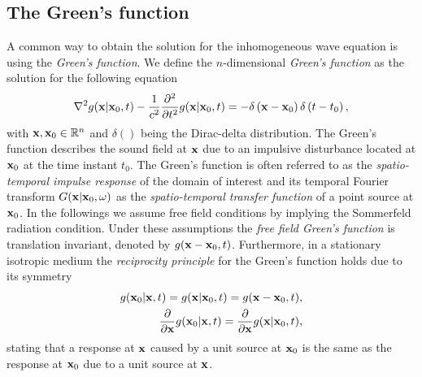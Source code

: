 \subsection{The Green's function}
A common way to obtain the solution for the inhomogeneous wave equation is using the \emph{Green's function}. 
We define the $n$-dimensional \emph{Green's function} as the solution for the following equation \cite{Gumerov2004, Williams1999}
\begin{equation}
\nabla^2 g(\mathbf{x}|\mathbf{x}_0,t) -\frac{1}{c^2}\frac{\partial^2}{\partial t^2} g(\mathbf{x}|\mathbf{x}_0,t) = -\delta\left( \mathbf{x} - \mathbf{x}_0 \right)\delta\left( t - t_0 \right),
\label{Eq:Theory:Green_function_def}
\end{equation}
with $\mathbf{x}, \mathbf{x}_0 \in \mathbb{R}^{n}$ and $\delta()$ being the Dirac-delta distribution. 
The Green's function describes the sound field at $\mathbf{x}$ due to an impulsive disturbance located at $\mathbf{x}_0$ at the time instant $t_0$.
The Green's function is often referred to as the \emph{spatio-temporal impulse response} of the domain of interest and its temporal Fourier transform $G(\mathbf{x}|\mathbf{x}_0,\omega)$ as the \emph{spatio-temporal transfer function} of a point source at $\mathbf{x}_0$. 
In the followings we assume free field conditions by implying the Sommerfeld radiation condition. 
Under these assumptions the \emph{free field Green's function} is translation invariant, denoted by $g(\mathbf{x}-\mathbf{x}_0,t)$.
Furthermore, in a stationary isotropic medium the \emph{reciprocity principle} for the Green's function holds due to its symmetry \cite{Stakgold2011}
\begin{eqnarray}
\label{Eq:Theory:Green_fun_reciprocity}
g(\mathbf{x}_0|\mathbf{x},t) = g(\mathbf{x}|\mathbf{x}_0,t) = g(\mathbf{x}-\mathbf{x}_0,t), \\
\frac{\partial}{\partial \mathbf{x}} g(\mathbf{x}_0|\mathbf{x},t)= \frac{\partial}{\partial \mathbf{x}} g(\mathbf{x}|\mathbf{x}_0,t),
\end{eqnarray}
stating that a response at $\mathbf{x}$ caused by a unit source at $\mathbf{x}_0$ is the same as the response at $\mathbf{x}_0$ due to a unit source at $\mathbf{x}$.

